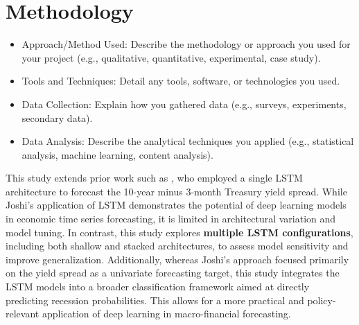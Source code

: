 
\section{Methodology}
\begin{itemize}
    \item Approach/Method Used: Describe the methodology or approach you used for your project (e.g., qualitative, quantitative, experimental, case study).
    \item Tools and Techniques: Detail any tools, software, or technologies you used.
    \item Data Collection: Explain how you gathered data (e.g., surveys, experiments, secondary data).
    \item Data Analysis: Describe the analytical techniques you applied (e.g., statistical analysis, machine learning, content analysis).
\end{itemize}




This study extends prior work such as \textcite{joshi2020forecasting}, who employed a single LSTM architecture to forecast the 10-year minus 3-month Treasury yield spread. While Joshi’s application of LSTM demonstrates the potential of deep learning models in economic time series forecasting, it is limited in architectural variation and model tuning. In contrast, this study explores \textbf{multiple LSTM configurations}, including both shallow and stacked architectures, to assess model sensitivity and improve generalization. Additionally, whereas Joshi’s approach focused primarily on the yield spread as a univariate forecasting target, this study integrates the LSTM models into a broader classification framework aimed at directly predicting recession probabilities. This allows for a more practical and policy-relevant application of deep learning in macro-financial forecasting.
